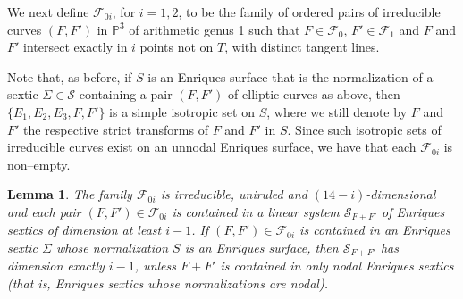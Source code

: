 \documentclass[11pt]{amsart}
\newtheorem{lemma}[thm]{Lemma}
\theoremstyle{definition}
\def\PP{{\mathbb P}}
\def\F{{\mathcal F}}
\begin{document}
We next define $\F_{0i}$, for $i=1,2$, to be the family of ordered pairs of
\color{black} irreducible \color{black}  curves $(F,F')$ in $\PP^3$ \color{black} of arithmetic genus 1 \color{black} such that $F \in \F_0$, $F' \in \F_1$ and $F$ and $F'$ intersect exactly in $i$ points not on $T$, with distinct tangent lines. 


\color{black} Note that, as before, if $S$ is an Enriques surface that is
the normalization of a sextic $\Sigma \in \mathcal{S}$ containing a
pair $(F,F')$ of elliptic curves as above,
then $\{E_1,E_2,E_3, F, F'\}$ is a simple isotropic set on $S$,
where we still denote by $F$ and $F'$ the respective strict transforms
of $F$ and $F'$ in $S$.  \color{black} Since such  isotropic sets of irreducible curves exist on an unnodal Enriques surface, we have that  each $\F_{0i}$ is non--empty. 
\color{black}

\begin{lemma} \label{lemma:irr+solouna3}
  The family $\F_{0i}$ is irreducible, uniruled and $(14-i)$-dimensional and each pair $(F,F') \in \F_{0i}$ is contained in a linear system $\mathcal{S}_{F+F'}$ of Enriques sextics of dimension at least $i-1$. If $(F,F') \in \F_{0i}$ is contained in an Enriques sextic $\Sigma$ whose normalization $S$ is an Enriques surface, then $\mathcal{S}_{F+F'}$ has dimension exactly $i-1$, unless $F+F'$  is contained in only {\em nodal} Enriques sextics (that is, Enriques sextics whose normalizations \color{black} are nodal\color{black}). 
\end{lemma}
\end{document}
